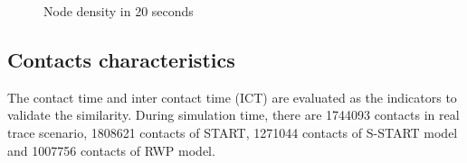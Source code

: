\begin{figure}
\centering
{}

\caption{Node density in 20 seconds}\label{figure_node_distribution}
\end{figure}


\subsection{Contacts characteristics}

The contact time and inter contact time (ICT) \cite{vHuWang-23} are evaluated as the indicators to validate the similarity.
During simulation time, there are 1744093 contacts in real trace scenario, 1808621 contacts of START, 1271044 contacts of S-START model and 1007756 contacts of RWP model.


